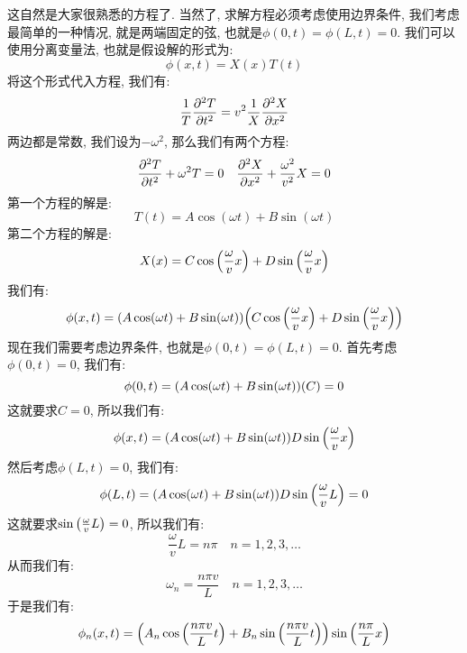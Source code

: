 这自然是大家很熟悉的方程了.
当然了, 求解方程必须考虑使用边界条件, 我们考虑最简单的一种情况, 就是两端固定的弦, 也就是$\phi(0,t) = \phi(L,t) = 0$.
我们可以使用分离变量法, 也就是假设解的形式为:
\begin{equation}
  \phi(x,t) = X(x)T(t)
\end{equation}
将这个形式代入方程, 我们有:
\begin{equation}
  \frac{1}{T} \pdv[2]{T}{t} = v^2 \frac{1}{X} \pdv[2]{X}{x}
\end{equation}
两边都是常数, 我们设为$-\omega^2$, 那么我们有两个方程:
\begin{align}
  \pdv[2]{T}{t} + \omega^2 T = 0 \quad \pdv[2]{X}{x} + \frac{\omega^2}{v^2} X = 0
\end{align}
第一个方程的解是:
\begin{equation}
  T(t) = A \cos(\omega t) + B \sin(\omega t)
\end{equation}
第二个方程的解是:
\begin{equation}
  X(x) = C \cos\pqty{\frac{\omega}{v} x } + D \sin\pqty{\frac{\omega}{v} x}
\end{equation}
我们有:
\begin{equation}
  \phi(x,t) = \pqty{A \cos(\omega t) + B \sin(\omega t)} \pqty{C \cos\pqty{\frac{\omega}{v} x} + D \sin\pqty{\frac{\omega}{v} x}}
\end{equation}
现在我们需要考虑边界条件, 也就是$\phi(0,t) = \phi(L,t) = 0$.
首先考虑$\phi(0,t) = 0$, 我们有:
\begin{equation}
  \phi(0,t) = \pqty{A \cos(\omega t) + B \sin(\omega t)} \pqty{C} = 0
\end{equation}
这就要求$C=0$, 所以我们有:
\begin{equation}
  \phi(x,t) = \pqty{A \cos(\omega t) + B \sin(\omega t)} D \sin\pqty{\frac{\omega}{v} x}
\end{equation}
然后考虑$\phi(L,t) = 0$, 我们有:
\begin{equation}
  \phi(L,t) = \pqty{A \cos(\omega t) + B \sin(\omega t)} D \sin\pqty{\frac{\omega}{v} L} = 0
\end{equation}
这就要求$\sin\pqty{\frac{\omega}{v} L} = 0$, 所以我们有:
\begin{equation}
  \frac{\omega}{v} L = n\pi \quad n = 1, 2, 3, \ldots
\end{equation}
从而我们有:
\begin{equation}
  \omega_n = \frac{n\pi v}{L} \quad n = 1, 2, 3, \ldots
\end{equation}
于是我们有:
\begin{equation}
  \phi_n(x,t) = \left( A_n \cos\pqty{\frac{n\pi v}{L} t}  + B_n \sin\pqty{\frac{n\pi v}{L} t} \right) \sin\pqty{\frac{n\pi}{L} x}
\end{equation}
